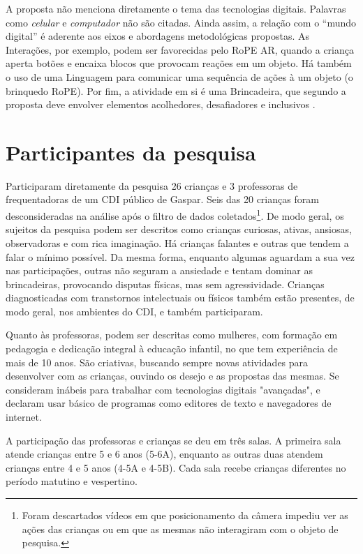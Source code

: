 A proposta não menciona diretamente o tema das tecnologias digitais. Palavras como \textit{celular} e \textit{computador} não são citadas. Ainda assim, a relação com o “mundo digital” é aderente aos eixos e abordagens metodológicas propostas. As Interações, por exemplo, podem ser favorecidas pelo RoPE AR, quando a criança aperta botões e encaixa blocos que provocam reações em um objeto. Há também o uso de uma Linguagem para comunicar uma sequência de ações à um objeto (o brinquedo RoPE). Por fim, a atividade em si é uma Brincadeira, que segundo a proposta deve envolver elementos acolhedores, desafiadores e inclusivos \cite[p.50]{gaspar_proposta_2010}. 


\section{Participantes da pesquisa}
\label{sec:participantes}

Participaram diretamente da pesquisa 26 crianças e 3 professoras de frequentadoras de um CDI público de Gaspar. Seis das 20 crianças foram desconsideradas na análise após o filtro de dados coletados\footnote{Foram descartados vídeos em que posicionamento da câmera impediu ver as ações das crianças ou em que as mesmas não interagiram com o objeto de pesquisa.}. De modo geral, os sujeitos da pesquisa podem ser descritos como crianças curiosas, ativas, ansiosas, observadoras e com rica imaginação. Há crianças falantes e outras que tendem a falar o mínimo possível. Da mesma forma, enquanto algumas aguardam a sua vez nas participações, outras não seguram a ansiedade e tentam dominar as brincadeiras, provocando disputas físicas, mas sem agressividade. Crianças diagnosticadas com transtornos intelectuais ou físicos também estão presentes, de modo geral, nos ambientes do CDI, e também participaram.

Quanto às professoras, podem ser descritas como mulheres, com formação em pedagogia e dedicação integral à educação infantil, no que tem experiência de mais de 10 anos. São criativas, buscando sempre novas atividades para desenvolver com as crianças, ouvindo os desejo e as propostas das mesmas. Se consideram inábeis para trabalhar com tecnologias digitais "avançadas", e declaram usar básico de programas como editores de texto e navegadores de internet.

A participação das professoras e crianças se deu em três salas. A primeira sala atende crianças entre 5 e 6 anos (5-6A), enquanto as outras duas atendem crianças entre 4 e 5 anos (4-5A e 4-5B). Cada sala recebe crianças diferentes no período matutino e vespertino.

